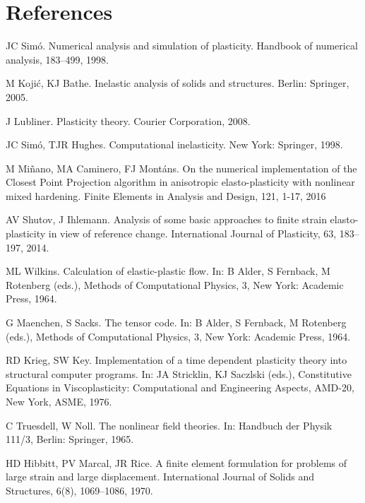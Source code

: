 \documentclass[preprint,review,12pt,sort&compress]{elsarticle}%
\begin{document}
\section*{References}

\begin{thebibliography}{99}                                                                                               %


JC Sim\'{o}. Numerical analysis and simulation of plasticity.
Handbook of numerical analysis, 183--499, 1998.

M Koji\'{c}, KJ Bathe. Inelastic analysis of solids
and structures. Berlin: Springer, 2005.

J Lubliner. Plasticity theory. Courier Corporation, 2008.

JC Sim\'{o}, TJR Hughes. Computational inelasticity.
New York: Springer, 1998.

M Mi\~{n}ano, MA Caminero, FJ Mont\'{a}ns. On the
numerical implementation of the Closest Point Projection algorithm in
anisotropic elasto-plasticity with nonlinear mixed hardening. Finite Elements
in Analysis and Design, 121, 1-17, 2016

AV Shutov, J Ihlemann. Analysis of some basic
approaches to finite strain elasto-plasticity in view of reference change.
International Journal of Plasticity, 63, 183--197, 2014.

ML Wilkins. Calculation of elastic-plastic flow. In: B
Alder, S Fernback, M Rotenberg (eds.), Methods of Computational Physics, 3,
New York: Academic Press, 1964.

G Maenchen, S Sacks. The tensor code. In: B Alder, S
Fernback, M Rotenberg (eds.), Methods of Computational Physics, 3, New York:
Academic Press, 1964.

RD Krieg, SW Key. Implementation of a time dependent
plasticity theory into structural computer programs. In: JA Stricklin, KJ
Saczlski (eds.), Constitutive Equations in Viscoplasticity: Computational and
Engineering Aspects, AMD-20, New York, ASME, 1976.

C Truesdell, W Noll. The nonlinear field theories.
In: Handbuch der Physik 111/3, Berlin: Springer, 1965.

HD Hibbitt, PV Marcal, JR Rice. A finite element
formulation for problems of large strain and large displacement. International
Journal of Solids and Structures, 6(8), 1069--1086, 1970.


\end{thebibliography}
\end{document}
